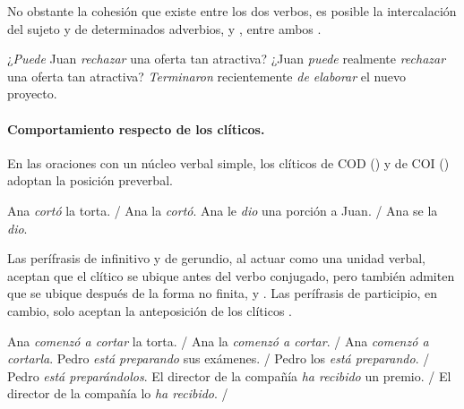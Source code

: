 No obstante la cohesión que existe entre los dos verbos, es posible la
intercalación del sujeto  y de determinados adverbios,
 y , entre ambos
\parencite[243]{bosque2019}.

\begin{exe}
  \ex
    \begin{xlist}
      \ex\label{ex:11-oferta-a} ¿\textit{Puede} Juan \textit{rechazar} una oferta
          tan atractiva?
      \ex\label{ex:11-oferta-b} ¿Juan \textit{puede} realmente \textit{rechazar}
          una oferta tan atractiva?
      \ex\label{ex:11-oferta-c} \textit{Terminaron} recientemente \textit{de
          elaborar} el nuevo proyecto.
    \end{xlist}
\end{exe}

\paragraph{Comportamiento respecto de los clíticos.} En las oraciones con un
núcleo verbal simple, los clíticos de COD () y de COI
() adoptan la posición preverbal.

\begin{exe}
  \ex
    \begin{xlist}
      \ex Ana \textit{cortó} la torta. / Ana la \textit{cortó}.
      \ex Ana le \textit{dio} una porción a Juan. / Ana se la \textit{dio}.
    \end{xlist}
\end{exe}

Las perífrasis de infinitivo y de gerundio, al actuar como una unidad verbal,
aceptan que el clítico se ubique antes del verbo conjugado, pero también admiten
que se ubique después de la forma no finita,  y
. Las perífrasis de participio, en cambio, solo aceptan la
anteposición de los clíticos .

\begin{exe}
  \ex\label{ex:11-torta} Ana \textit{comenzó a cortar} la torta. / Ana la
      \textit{comenzó a cortar}. / Ana \textit{comenzó a cortarla}.
  \ex\label{ex:11-examenes} Pedro \textit{está preparando} sus exámenes. / Pedro
      los \textit{está preparando}. / Pedro \textit{está preparándolos}.
  \ex\label{ex:11-premio} El director de la compañía \textit{ha recibido} un
      premio. / El director de la compañía lo \textit{ha recibido}. /
\end{exe}

